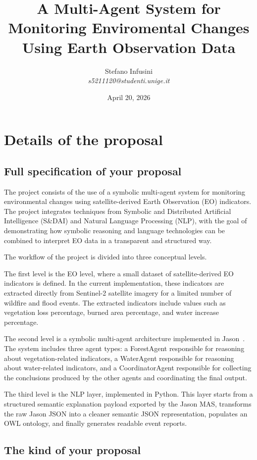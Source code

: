\documentclass[12pt]{article}
\title{A Multi-Agent System for Monitoring Enviromental Changes Using Earth Observation Data}
\author{Stefano Infusini\\
{\em s5211120@studenti.unige.it}}
\date{April 20, 2026}
\begin{document}
\maketitle

\section{Details of the proposal}
\label{sec:yourProposal}

\subsection{Full specification of your proposal}
\label{subsec:specification}

The project consists of the use of a symbolic multi-agent system for monitoring environmental changes using satellite-derived Earth Observation (EO) indicators. The project integrates techniques from Symbolic and Distributed Artificial Intelligence (S\&DAI) and Natural Language Processing (NLP), with the goal of demonstrating how symbolic reasoning and language technologies can be combined to interpret EO data in a transparent and structured way.

The workflow of the project is divided into three conceptual levels.

The first level is the EO level, where a small dataset of satellite-derived EO indicators is defined. In the current implementation, these indicators are extracted directly from Sentinel-2 satellite imagery for a limited number of wildfire and flood events. The extracted indicators include values such as vegetation loss percentage, burned area percentage, and water increase percentage.

The second level is a symbolic multi-agent architecture implemented in Jason~\cite{bordini2007jason}. The system includes three agent types: a ForestAgent responsible for reasoning about vegetation-related indicators, a WaterAgent responsible for reasoning about water-related indicators, and a CoordinatorAgent responsible for collecting the conclusions produced by the other agents and coordinating the final output.

The third level is the NLP layer, implemented in Python. This layer starts from a structured semantic explanation payload exported by the Jason MAS, transforms the raw Jason JSON into a cleaner semantic JSON representation, populates an OWL ontology, and finally generates readable event reports.

\subsection{The kind of your proposal}
\label{subsec:kind}
\end{document}
